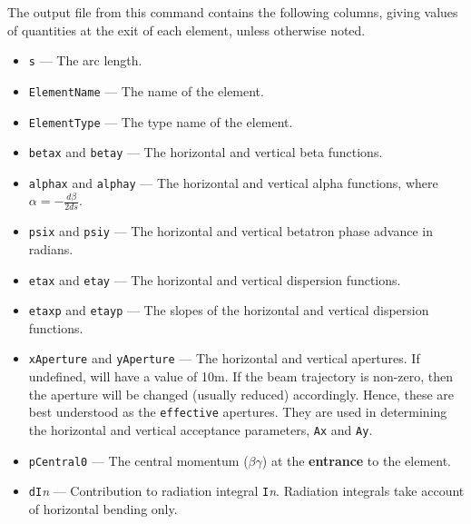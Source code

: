 \documentclass[11pt]{article}
\begin{document}
The output file from this command contains the following columns, giving values of quantities at the
exit of each element, unless otherwise noted.
\begin{itemize}
\item {\tt s} --- The arc length.
\item {\tt ElementName} --- The name of the element.
\item {\tt ElementType} --- The type name of the element.
\item {\tt betax} and {\tt betay} --- The horizontal and vertical beta functions.
\item {\tt alphax} and {\tt alphay} --- The horizontal and vertical alpha functions, where $\alpha = -\frac{d \beta}{2 ds}$.
\item {\tt psix} and {\tt psiy} --- The horizontal and vertical betatron phase advance in radians.
\item {\tt etax} and {\tt etay} --- The horizontal and vertical dispersion functions.
\item {\tt etaxp} and {\tt etayp} --- The slopes of the horizontal and vertical dispersion functions.
\item {\tt xAperture} and {\tt yAperture} --- The horizontal and vertical apertures.  If undefined, will have a 
 value of 10m.  If the beam trajectory is non-zero, then the aperture will be changed (usually reduced) accordingly.  Hence, these
 are best understood as the {\tt effective} apertures.  They are used in determining the horizontal and vertical acceptance
 parameters, {\tt Ax} and {\tt Ay}.
\item {\tt pCentral0} --- The central momentum ($\beta\gamma$) at the {\bf entrance} to the element.
\item {\tt dI}{\em n} --- Contribution to radiation integral {\tt I}{\em n}.  Radiation integrals take account of
  horizontal bending only.
\end{itemize}
\end{document}

